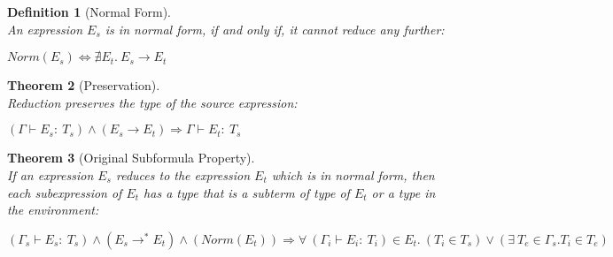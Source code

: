 \documentclass[11p,a4paper]{article}
\newcommand{\typecolor}{}
\newcommand{\termcolor}{}
\newcommand{\tp}[1]{{\typecolor #1}}
\newcommand{\tm}[1]{{\termcolor #1}}
\newtheorem{theorem}{Theorem}
\newtheorem{definition}[theorem]{Definition}
\newcommand{\env}{\tp{\Gamma}}
\newcommand{\typing}[2]{\tm{#1:\ }\tp{#2}}
\newcommand{\reduce}[2]{#1 \longrightarrow^* #2}
\begin{document}
\begin{definition}[Normal Form]\ \\
An expression $E_s$ is in normal form, if and only if, it cannot reduce any further:

$ Norm(E_s) \Leftrightarrow \nexists E_t.\ E_s \longrightarrow E_t$

\end{definition}

\begin{theorem}[Preservation]\ \\
Reduction preserves the type of the source expression:

$(\env \vdash \typing{E_s}{T_s})\wedge(E_s \longrightarrow E_t)\Rightarrow \env \vdash \typing{E_t}{T_s}$
\end{theorem}

\begin{theorem}[Original Subformula Property]\ \\
If an expression $E_s$ reduces to the expression $E_t$ which is in
normal form, then each subexpression of $E_t$ has a type that is a
subterm of type of $E_t$ or a type in the environment:

$$(\Gamma_s \vdash \typing{E_s}{T_s}) \wedge (\reduce{E_s}{E_t}) \wedge (Norm(E_t))
   \Rightarrow
   \forall\ (\Gamma_i \vdash \typing{E_i}{T_i}) \in E_t.\ (T_i \in T_s) 
            \vee 
            (\exists\ T_e \in \Gamma_s. T_i \in T_e)$$

 
\end{theorem}

 
\end{document}

